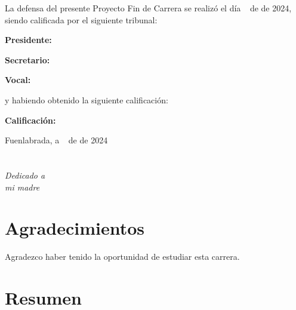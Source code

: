\documentclass[a4paper, 12pt]{book}
\begin{document}
\vspace{1cm}
La defensa del presente Proyecto Fin de Carrera se realizó el día \qquad$\;\,$ de \qquad\qquad\qquad\qquad \newline de 2024, siendo calificada por el siguiente tribunal:


\vspace{0.5cm}
\textbf{Presidente:}

\vspace{1.2cm}
\textbf{Secretario:}

\vspace{1.2cm}
\textbf{Vocal:}


\vspace{1.2cm}
y habiendo obtenido la siguiente calificación:

\vspace{1cm}
\textbf{Calificación:}


\vspace{1cm}
\begin{flushright}
Fuenlabrada, a \qquad$\;\,$ de \qquad\qquad\qquad\qquad de 2024
\end{flushright}


\chapter*{}
\begin{flushright}
\textit{Dedicado a \\
mi madre}
\end{flushright}


\chapter*{Agradecimientos}

Agradezco haber tenido la oportunidad de estudiar esta carrera. 


\chapter*{Resumen}
\end{document}
